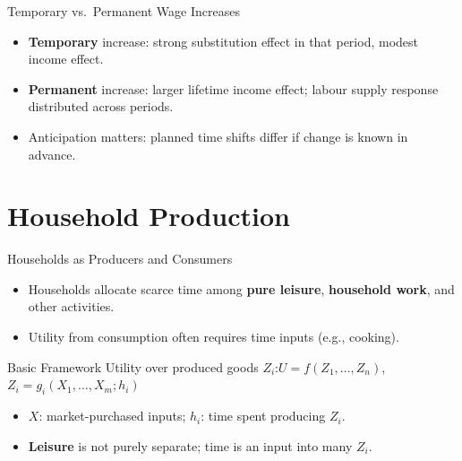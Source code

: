 \documentclass[aspectratio=169]{beamer}
\begin{document}
\begin{frame}{Temporary vs.\ Permanent Wage Increases}
\transfade
\begin{itemize}[<+->]
  \item \textbf{Temporary} increase: strong substitution effect in that period, modest income effect.
  \item \textbf{Permanent} increase: larger lifetime income effect; labour supply response distributed across periods.
  \item Anticipation matters: planned time shifts differ if change is known in advance.
\end{itemize}
\end{frame}

\section{Household Production}

\begin{frame}{Households as Producers and Consumers}
\transfade
\begin{itemize}[<+->]
  \item Households allocate scarce time among \textbf{pure leisure}, \textbf{household work}, and other activities.
  \item Utility from consumption often requires time inputs (e.g., cooking).
\end{itemize}
\end{frame}

\begin{frame}{Basic Framework}
\transfade
\small
Utility over produced goods \(Z_i\):\quad \(U=f(Z_1,\dots,Z_n)\), \quad
\(Z_i=g_i(X_1,\dots,X_m; h_i)\)\par
\begin{itemize}[<+->]
  \item \(X\): market-purchased inputs; \(h_i\): time spent producing \(Z_i\).
  \item \textbf{Leisure} is not purely separate; time is an input into many \(Z_i\).
\end{itemize}
\end{frame}
\end{document}
